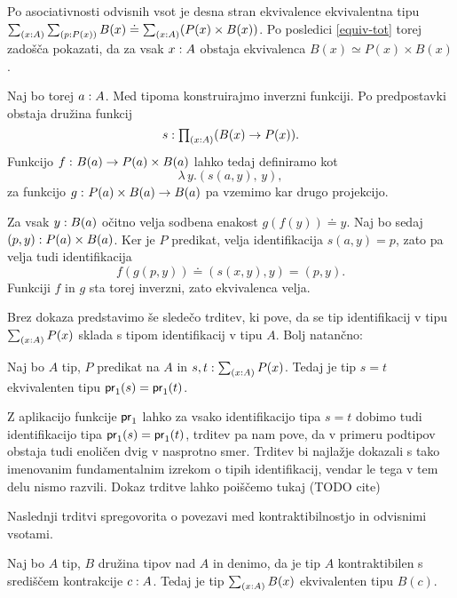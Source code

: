 \begin{dokaz}
  Po asociativnosti odvisnih vsot je desna stran ekvivalence ekvivalentna tipu
  \(\textstyle \sum_{\left( x : A \right)} \textstyle \sum_{\left( p : P(x) \right)} B(x) \doteq \textstyle \sum_{\left( x : A \right)} (P(x) \times B(x))\).
  Po posledici \ref{equiv-tot} torej zadošča pokazati, da za vsak \(x : A\)
  obstaja ekvivalenca \(B(x) \simeq P(x) \times B(x)\).

  Naj bo torej \(a : A\). Med tipoma konstruirajmo inverzni funkciji. Po predpostavki obstaja družina funkcij
  \[s : \textstyle \prod_{\left( x : A \right)} (B(x) \to P(x)).\]
  Funkcijo \(f \,\colon B(a) \to P(a) \times B(a)\) lahko tedaj definiramo kot
  \[\lambda \, y. \left(s(a,y),\, y\right),\] za funkcijo \(g \,\colon P(a) \times B(a) \to B(a)\) pa
  vzemimo kar drugo projekcijo.

  Za vsak \(y : B(a)\) očitno velja sodbena enakost \(g(f(y)) \doteq y\). Naj bo sedaj \((p, y) : P(a) \times B(a)\). Ker je \(P\)
  predikat, velja identifikacija \(s(a, y) = p\), zato pa velja tudi identifikacija
  \[f(g\left(p, y\right)) \doteq \left(s(x, y), y\right) = \left(p, y\right).\]
  Funkciji \(f\) in \(g\) sta torej inverzni, zato ekvivalenca velja.
\end{dokaz}

Brez dokaza predstavimo še sledečo trditev, ki pove, da se tip identifikacij v tipu \(\textstyle \sum_{\left( x : A \right)} P(x)\) sklada s tipom identifikacij v tipu \(A\). Bolj natančno:

\begin{trditev}
  \label{subtype-id}
  Naj bo \(A\) tip, \(P\) predikat na \(A\) in
  \(s, t : \textstyle \sum_{\left( x : A \right)} P(x)\). Tedaj je tip \(s = t\) ekvivalenten tipu \(\textnormal{\textsf{pr}}_{1}(s) = \textnormal{\textsf{pr}}_{1}(t)\).
\end{trditev}
Z aplikacijo funkcije \(\textnormal{\textsf{pr}}_{1}\) lahko za vsako identifikacijo tipa \(s = t\) dobimo tudi identifikacijo tipa \(\textnormal{\textsf{pr}}_{1}(s) = \textnormal{\textsf{pr}}_{1}(t)\), trditev pa nam pove, da v primeru podtipov obstaja tudi enoličen dvig v nasprotno smer.
Trditev bi najlažje dokazali s tako imenovanim fundamentalnim izrekom o tipih identifikacij, vendar le tega v tem delu nismo razvili. Dokaz trditve lahko poiščemo tukaj (TODO cite)

Naslednji trditvi spregovorita o povezavi med kontraktibilnostjo in odvisnimi vsotami.

\begin{trditev}
  \label{sigma-contr-base}
  Naj bo \(A\) tip, \(B\) družina tipov nad \(A\) in denimo, da je tip \(A\) kontraktibilen s središčem kontrakcije \(c : A\). Tedaj je tip \(\textstyle \sum_{\left( x : A \right)} B(x)\) ekvivalenten tipu \(B(c)\).
\end{trditev}

